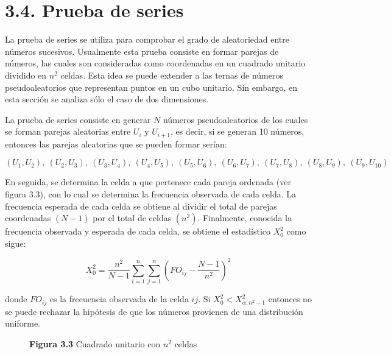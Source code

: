 \documentclass[11pt,letterpaper]{report}
\begin{document}
\section*{3.4. Prueba de series}

La prueba de series se utiliza para comprobar el grado de aleatoriedad
entre números sucesivos. Usualmente esta prueba consiste en formar
parejas de números, las cuales son consideradas como coordenadas en un
cuadrado unitario dividido en $n^2$ celdas. Esta idea se puede extender
a las ternas de números pseudoaleatorios que representan puntos en un
cubo unitario. Sin embargo, en esta sección se analiza sólo el caso de
dos dimensiones.

La prueba de series consiste en generar $N$ números pseudoaleatorios de
los cuales se forman parejas aleatorias entre $U_i$ y $U_{i+1}$, es
decir, si se generan 10 números, entonces las parejas aleatorias que se
pueden formar serían:

\[
(U_1,U_2),\ (U_2,U_3),\ (U_3,U_4),\ (U_4,U_5),\ (U_5,U_6),\
(U_6,U_7),\ (U_7,U_8),\ (U_8,U_9),\ (U_9,U_{10})
\]

En seguida, se determina la celda a que pertenece cada pareja ordenada
(ver figura 3.3), con lo cual se determina la frecuencia observada de
cada celda. La frecuencia esperada de cada celda se obtiene al dividir
el total de parejas coordenadas $(N-1)$ por el total de celdas $(n^2)$.
Finalmente, conocida la frecuencia observada y esperada de cada celda,
se obtiene el estadístico $X_0^2$ como sigue:

\begin{equation}
X_0^2 = \frac{n^2}{N-1} \sum_{i=1}^{n} \sum_{j=1}^{n} \left( FO_{ij} - \frac{N-1}{n^2} \right)^2
\end{equation}

donde $FO_{ij}$ es la frecuencia observada de la celda $ij$. Si $X_0^2 <
X^2_{\alpha,n^2-1}$ entonces no se puede rechazar la hipótesis de que
los números provienen de una distribución uniforme.

\begin{figure}[H]
\centering
{}
\caption*{\textbf{Figura 3.3} Cuadrado unitario con $n^2$ celdas}
\end{figure}
\end{document}
